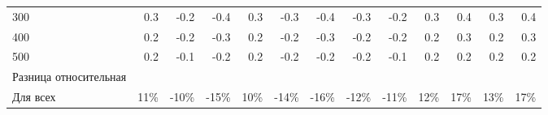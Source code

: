 \begin{sidewaystable}[p]
\begin{tabular}{@{}lrrrrrrrrrrrr@{}}
    300 & 0.3 & -0.2 & -0.4 & 0.3 & -0.3 & -0.4 & -0.3 & -0.2 & 0.3 & 0.4 & 0.3 & 0.4 \\
    400 & 0.2 & -0.2 & -0.3 & 0.2 & -0.2 & -0.3 & -0.2 & -0.2 & 0.2 & 0.3 & 0.2 & 0.3 \\
    500 & 0.2 & -0.1 & -0.2 & 0.2 & -0.2 & -0.2 & -0.2 & -0.1 & 0.2 & 0.2 & 0.2 & 0.2 \\
    \midrule
    Разница относительная &  &  &  &  &  &  &  &  &  &  &  &  \\
    Для всех & 11\% & -10\% & -15\% & 10\% & -14\% & -16\% & -12\% & -11\% & 12\% & 17\% & 13\% & 17\% \\

    
    \bottomrule
    \end{tabular}
    \\ 
\end{sidewaystable}








